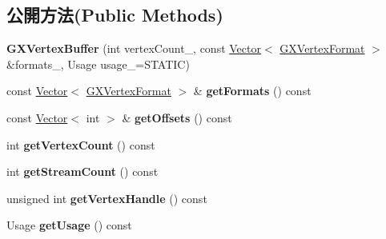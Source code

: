 \subsection*{公開方法(Public Methods)}
\begin{DoxyCompactItemize}
\item 
{\bfseries G\+X\+Vertex\+Buffer} (int vertex\+Count\+\_\+, const \hyperlink{class_i_dream_sky_1_1_vector}{Vector}$<$ \hyperlink{class_i_dream_sky_1_1_g_x_vertex_format}{G\+X\+Vertex\+Format} $>$ \&formats\+\_\+, Usage usage\+\_\+=S\+T\+A\+T\+IC)\hypertarget{class_i_dream_sky_1_1_g_x_vertex_buffer_a8474ab6e77cd09be5c443dfe3d95723c}{}\label{class_i_dream_sky_1_1_g_x_vertex_buffer_a8474ab6e77cd09be5c443dfe3d95723c}

\item 
const \hyperlink{class_i_dream_sky_1_1_vector}{Vector}$<$ \hyperlink{class_i_dream_sky_1_1_g_x_vertex_format}{G\+X\+Vertex\+Format} $>$ \& {\bfseries get\+Formats} () const \hypertarget{class_i_dream_sky_1_1_g_x_vertex_buffer_a53e959a875f07c690d17850f635170d6}{}\label{class_i_dream_sky_1_1_g_x_vertex_buffer_a53e959a875f07c690d17850f635170d6}

\item 
const \hyperlink{class_i_dream_sky_1_1_vector}{Vector}$<$ int $>$ \& {\bfseries get\+Offsets} () const \hypertarget{class_i_dream_sky_1_1_g_x_vertex_buffer_a9643c1d5bf2bde53e517edc9055660d3}{}\label{class_i_dream_sky_1_1_g_x_vertex_buffer_a9643c1d5bf2bde53e517edc9055660d3}

\item 
int {\bfseries get\+Vertex\+Count} () const \hypertarget{class_i_dream_sky_1_1_g_x_vertex_buffer_a2ed34e2b8a569343938243fb45b8a49a}{}\label{class_i_dream_sky_1_1_g_x_vertex_buffer_a2ed34e2b8a569343938243fb45b8a49a}

\item 
int {\bfseries get\+Stream\+Count} () const \hypertarget{class_i_dream_sky_1_1_g_x_vertex_buffer_a931bdbe2b3f76d1c9f44843ca506eec0}{}\label{class_i_dream_sky_1_1_g_x_vertex_buffer_a931bdbe2b3f76d1c9f44843ca506eec0}

\item 
unsigned int {\bfseries get\+Vertex\+Handle} () const \hypertarget{class_i_dream_sky_1_1_g_x_vertex_buffer_a30b98fc9bb15f0ccaf340f9c2279a2ab}{}\label{class_i_dream_sky_1_1_g_x_vertex_buffer_a30b98fc9bb15f0ccaf340f9c2279a2ab}

\item 
Usage {\bfseries get\+Usage} () const \hypertarget{class_i_dream_sky_1_1_g_x_vertex_buffer_a0b1219d8176655b2e41cfb13b03af72a}{}\label{class_i_dream_sky_1_1_g_x_vertex_buffer_a0b1219d8176655b2e41cfb13b03af72a}


\end{DoxyCompactItemize}
